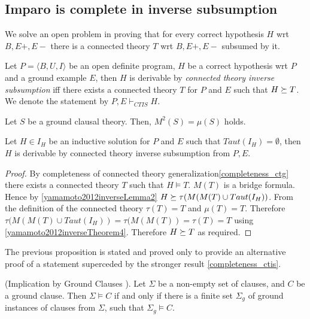 \subsection{Imparo is complete in inverse subsumption}
We solve an open problem in \cite{yamamoto2012inverse} proving that for every correct hypothesis $H$ wrt $B, E+, E-$ there is a connected theory $T$ wrt $B, E+, E-$ subsumed by it.
\begin{defn}
Let $P=\langle B, U, I \rangle$ be an open definite program, $H$ be a correct hypothesis wrt $P$ and a ground example $E$, then $H$ is derivable by
\emph{connected theory inverse subsumption}
iff there exists a connected theory $T$ for $P$ and $E$ such that $H \succeq T$.
We denote the statement by $P, E \vdash_{CTIS} H$.
\end{defn}

\begin{thm}\label{yamamoto2012inverseTheorem4}\cite{yamamoto2012inverse}
Let $S$ be a ground clausal theory. Then, $M^2(S) = \mu(S)$ holds.
\end{thm}

\begin{proposition}
Let $H \in I_H$ be an inductive solution for $P$ and $E$ such that $Taut(I_H)=\emptyset$, then $H$ is derivable by connected theory inverse subsumption from $P, E$.
\end{proposition}
\begin{proof}
By completeness of connected theory generalization\ref{completeness_ctg} there exists a connected theory $T$ such that $H \models T$. $M(T)$ is a bridge formula.
Hence by \ref{yamamoto2012inverseLemma2}
$H \succeq \tau(M(M(T) \cup Taut(I_H))$. From the definition of the connected theory $\tau(T)=T$ and $\mu (T)=T$.
Therefore $\tau(M(M(T) \cup Taut(I_H))=\tau(M(M(T))=\tau(T)=T$ using
\ref{yamamoto2012inverseTheorem4}. Therefore $H \succeq T$ as required.
\end{proof}
\begin{remark}
The previous proposition is stated and proved only to provide an alternative proof of a statement superceded by the stronger result \ref{completeness_ctis}.
\end{remark}

\begin{thm}\label{implicationByGroundClauses}
(Implication by Ground Clauses \cite{nienhuys1997foundations}). Let $\Sigma$ be a non-empty set of clauses,
and $C$ be a ground clause. Then $\Sigma \models C$ if and only if there is a finite set $\Sigma_g$ of ground
instances of clauses from $\Sigma$, such that $\Sigma_g \models C$.
\end{thm}

